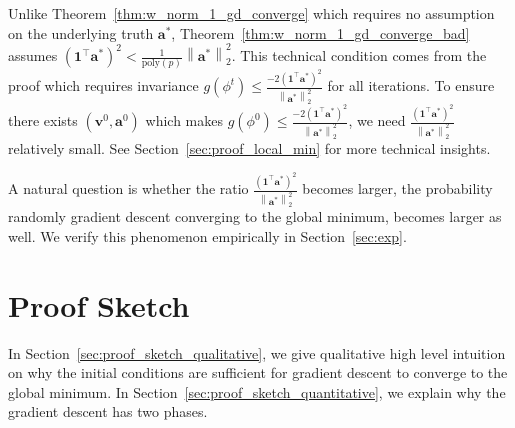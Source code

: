\documentclass{article}
\newcommand{\poly}{\mathrm{poly}}
\newcommand{\firstlayerWN}{v}
\newcommand{\secondlayer}{a}
\newcommand{\vect}[1]{\mathbf{#1}}
\newcommand{\norm}[1]{\left\|#1\right\|}
\begin{document}
Unlike Theorem~\ref{thm:w_norm_1_gd_converge} which requires no assumption on the underlying truth $\vect{\secondlayer}^*$, Theorem~\ref{thm:w_norm_1_gd_converge_bad} assumes  $\left(\vect{1}^\top \vect{\secondlayer}^*\right)^2 < \frac{1}{\poly(p)}\norm{\vect{\secondlayer}^*}_2^2$.
This technical condition comes from the proof which requires invariance $g(\phi^t) \le \frac{-2\left(\vect{1}^\top \vect{\secondlayer}^*\right)^2}{\norm{\vect{\secondlayer}^*}_2^2}$ for all iterations.
To ensure there exists $\left(\vect{\firstlayerWN}^0,\vect{\secondlayer}^0\right)$ 
which makes $g(\phi^0) \le \frac{-2\left(\vect{1}^\top \vect{\secondlayer}^*\right)^2}{\norm{\vect{\secondlayer}^*}_2^2}$, we need $\frac{\left(\vect{1}^\top \vect{\secondlayer}^*\right)^2}{\norm{\vect{\secondlayer}^*}_2^2}$ relatively small.
See Section~\ref{sec:proof_local_min} for more technical insights.

A natural question is whether the ratio $\frac{\left(\vect{1}^\top \vect{\secondlayer}^*\right)^2}{\norm{\vect{\secondlayer}^*}_2^2}$ becomes larger, the probability randomly gradient descent converging to the global minimum, becomes larger as well.
We verify this phenomenon empirically in Section~\ref{sec:exp}.




\section{Proof Sketch}
\label{sec:proof_sketch}
In Section~\ref{sec:proof_sketch_qualitative}, we give qualitative high level intuition on why the initial conditions are sufficient for gradient descent to converge to the global minimum.
In Section~\ref{sec:proof_sketch_quantitative}, we explain why the gradient descent has two phases.
\end{document}

